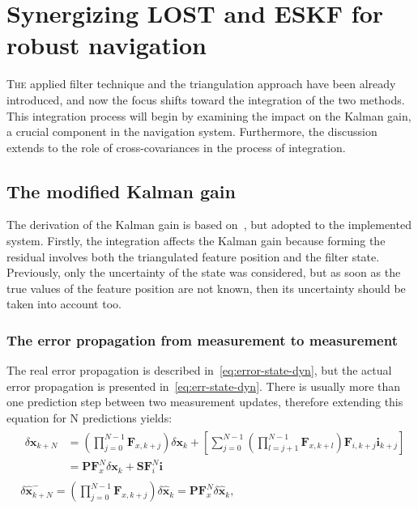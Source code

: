 \chapter{Synergizing LOST and ESKF for robust navigation}\label{chap:integration}

\lettrine{T}{he} applied filter technique and the triangulation approach have been already introduced, and now the focus shifts toward the integration of the two methods. This integration process will begin by examining the impact on the Kalman gain, a crucial component in the navigation system. Furthermore, the discussion extends to the role of cross-covariances in the process of integration.

\section{The modified Kalman gain}

The derivation of the Kalman gain is based on~\cite{discrete_kalman_tutorial}, but adopted to the implemented system. Firstly, the integration affects the Kalman gain because forming the residual involves both the triangulated feature position and the filter state. Previously, only the uncertainty of the state was considered, but as soon as the true values of the feature position are not known, then its uncertainty should be taken into account too.

\subsection{The error propagation from measurement to measurement}

The real error propagation is described in~\eqref{eq:error-state-dyn}, but the actual error propagation is presented in~\eqref{eq:err-state-dyn}. There is usually more than one prediction step between two measurement updates, therefore extending this equation for N predictions yields:
\begin{subequations}
\begin{align}
    & \begin{aligned}
    \delta\mathbf{x}_{k+N} &= \left(\prod_{j=0}^{N-1}\mathbf{F}_{x,k+j}\right)\delta\mathbf{x}_k + \left[\sum_{j=0}^{N-1}\left(\prod_{l=j+1}^{N-1}\mathbf{F}_{x,k+l} \right) \mathbf{F}_{i,k+j} \mathbf{i}_{k+j}\right] \\ &= \mathbf{PF}_x^N\delta\mathbf{x}_k + \mathbf{SF}_i^N \mathbf{i} 
    \end{aligned}\label{eq:true-error-state-prop} \\ &
    \delta\hat{\mathbf{x}}_{k+N}^- = \left( \prod_{j=0}^{N-1}\mathbf{F}_{x,k+j} \right) \delta\hat{\mathbf{x}}_k = \mathbf{PF}_x^N\delta\hat{\mathbf{x}}_k,\label{eq:est-error-state-prop}
\end{align}
\end{subequations}

